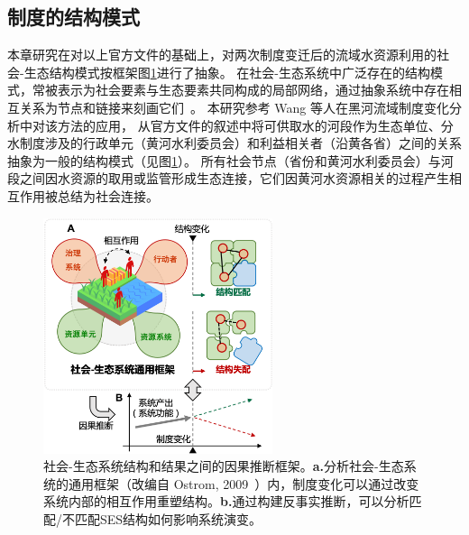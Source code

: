 \subsection{制度的结构模式}\label{sec:structures}

本章研究在对以上官方文件的基础上，对两次制度变迁后的流域水资源利用的社会-生态结构模式按框架图\ref{fig:framework}进行了抽象。
在社会-生态系统中广泛存在的结构模式，常被表示为社会要素与生态要素共同构成的局部网络，通过抽象系统中存在相互关系为节点和链接来刻画它们~\cite{bodin2017a,kluger2020,guerrero2015}。
本研究参考 Wang 等人在黑河流域制度变化分析中对该方法的应用\cite{wang2019d}，
从官方文件的叙述中将可供取水的河段作为生态单位、分水制度涉及的行政单元（黄河水利委员会）和利益相关者（沿黄各省）之间的关系抽象为一般的结构模式（见图\ref{fig:framework}）。
所有社会节点（省份和黄河水利委员会）与河段之间因水资源的取用或监管形成生态连接，它们因黄河水资源相关的过程产生相互作用被总结为社会连接。

\begin{figure}[!ht] %
    \centering
    \includegraphics[width=0.6\textwidth]{img/ch5/ch5_framework.png}
    \caption[社会-生态系统结构和结果之间的因果推断框架]{社会-生态系统结构和结果之间的因果推断框架。\textbf{a.}分析社会-生态系统的通用框架（改编自 Ostrom, 2009~\cite{ostrom2009}）内，制度变化可以通过改变系统内部的相互作用重塑结构。\textbf{b.}通过构建反事实推断，可以分析匹配/不匹配SES结构如何影响系统演变。}\label{fig:framework}
\end{figure}

